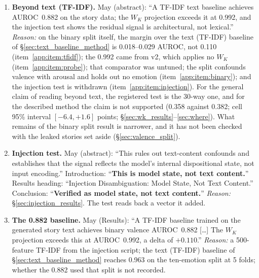 \documentclass[11pt,a4paper]{article}
\begin{document}
\begin{enumerate}[leftmargin=*]
    \item \textbf{Beyond text (TF-IDF).} May (abstract): ``A TF-IDF text baseline achieves AUROC~0.882 on the story data; the $W_K$ projection exceeds it at 0.992, and the injection test shows the residual signal is architectural, not lexical.'' \emph{Reason:} on the binary split itself, the margin over the text (TF-IDF) baseline of \S\ref{sec:text_baseline_method} is 0.018--0.029 AUROC, not 0.110 (item~\ref{app:item:tfidf}); the 0.992 came from v2, which applies no $W_K$ (item~\ref{app:item:probe}); that comparator was untuned; the split confounds valence with arousal and holds out no emotion (item~\ref{app:item:binary}); and the injection test is withdrawn (item~\ref{app:item:injection}). For the general claim of reading beyond text, the registered test is the 30-way one, and for the described method the claim is not supported (0.358 against 0.382; cell 95\% interval $[-6.4, +1.6]$ points; \S\ref{sec:wk_results}--\ref{sec:where}). What remains of the binary split result is narrower, and it has not been checked with the leaked stories set aside (\S\ref{sec:valence_split}).

    \item \label{app:item:injection}\textbf{Injection test.} May (abstract): ``This rules out text-content confounds and establishes that the signal reflects the model's internal dispositional state, not input encoding.'' Introduction: ``\textbf{This is model state, not text content.}'' Results heading: ``Injection Disambiguation: Model State, Not Text Content.'' Conclusion: ``\textbf{Verified as model state, not text content.}'' \emph{Reason:} \S\ref{sec:injection_results}. The test reads back a vector it added.

    \item \label{app:item:tfidf}\textbf{The 0.882 baseline.} May (Results): ``A TF-IDF baseline trained on the generated story text achieves binary valence AUROC~0.882 [\ldots] The $W_K$ projection exceeds this at AUROC~0.992, a delta of $+0.110$.'' \emph{Reason:} a 500-feature TF-IDF from the injection script; the text (TF-IDF) baseline of \S\ref{sec:text_baseline_method} reaches 0.963 on the ten-emotion split at 5 folds; whether the 0.882 used that split is not recorded.


\end{enumerate}
\end{document}
